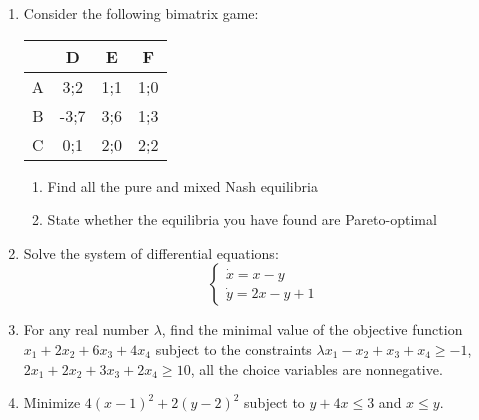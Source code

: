 \documentclass[12pt,a4paper]{article}
\begin{document}
\begin{enumerate}
\item   Consider the following bimatrix game:


\begin{tabular}{c|ccc}
 & D & E & F \\ 
\hline 
A & 3;2 & 1;1 & 1;0  \\ 
B & -3;7 & 3;6 & 1;3  \\ 
C & 0;1 & 2;0 & 2;2  \\ 
\end{tabular} 

\begin{enumerate}
\item Find all the pure and mixed Nash equilibria
\item State whether the equilibria you have found are Pareto-optimal
\end{enumerate}

\item Solve the system of differential equations:
\[
\begin{cases}
\dot{x}=x-y \\
\dot{y}=2x-y + 1
\end{cases}
\]

\item For any real number $\lambda$, find the minimal value of the objective function $x_1+2x_2+6x_3+4x_4$ subject to the constraints  $\lambda x_1-x_2+x_3+x_4\geq -1$, $2x_1+2x_2+3x_3+2x_4 \geq 10$,  all the choice variables are nonnegative. 


\item Minimize $4 (x-1)^2+2(y-2)^2$ subject to $y+4x\leq 3$ and $x\leq y$.




\end{enumerate}
\end{document}
